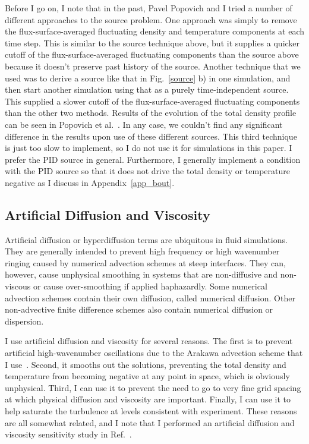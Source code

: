 Before I go on, I note that in the past, Pavel Popovich and I tried a number of different approaches to the source problem. One approach was simply to remove the flux-surface-averaged fluctuating
density and temperature components at each time step. This is similar to the source technique above, but it supplies a quicker cutoff of the flux-surface-averaged fluctuating components than the
source above because it doesn't preserve past history of the source. Another technique that we used was to derive a source like that in Fig.~\ref{source} b) in one simulation, and then start
another simulation using that as a purely time-independent source. This supplied a slower cutoff of the flux-surface-averaged fluctuating components than the other two methods. Results of
the evolution of the total density profile can be seen in Popovich et al.~\cite{popovich2010b}. In any case, we couldn't find any significant difference in the results upon use of these different
sources. This third technique is just too slow to implement, so I do not use it for simulations in this paper. I prefer the PID source in general. Furthermore, I generally implement a condition
with the PID source so that it does not drive the total density or temperature negative as I discuss in Appendix~\ref{app_bout}.

\subsection{Artificial Diffusion and Viscosity}
\label{ss_art_diff}

Artificial diffusion or hyperdiffusion terms are ubiquitous in fluid simulations. They are generally intended to prevent high frequency or high wavenumber ringing caused by numerical advection
schemes at steep interfaces. They can, however, cause unphysical smoothing in systems that are non-diffusive and non-viscous or cause over-smoothing if applied haphazardly. Some numerical
advection schemes contain their own diffusion, called numerical diffusion. Other non-advective finite difference schemes also contain numerical diffusion or dispersion.

I use artificial diffusion and viscosity for several reasons. The first is to prevent artificial high-wavenumber oscillations due to the Arakawa advection scheme that I use~\cite{arakawa1966}.
Second, it smooths out the solutions, preventing the total density and temperature from becoming negative at any point in space, which is obviously unphysical. Third, I can use it
to prevent the need to go to very fine grid spacing at which physical diffusion and viscosity are important. Finally, I can use it to help saturate the turbulence at levels consistent with experiment.
These reasons are all somewhat related, and I note that I performed an artificial diffusion and viscosity sensitivity study in Ref.~\cite{friedman2012}.

